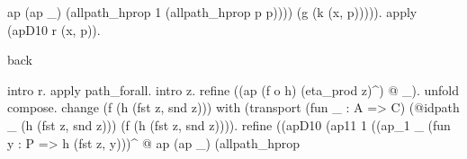 \begin{coqdoccode}
\begin{coqdoccomment}
ap\coqdocindent{0.50em}
(ap\coqdocindent{0.50em}
\_)\coqdoceol
\coqdocindent{8.50em}
(allpath\_hprop\coqdocindent{0.50em}
1\coqdocindent{0.50em}
(allpath\_hprop\coqdocindent{0.50em}
p\coqdocindent{0.50em}
p))))\coqdocindent{0.50em}
\coqdoceol
\coqdocindent{5.50em}
(g\coqdocindent{0.50em}
(k\coqdocindent{0.50em}
(x,\coqdocindent{0.50em}
p))))).\coqdoceol
\coqdocindent{1.00em}
apply\coqdocindent{0.50em}
(apD10\coqdocindent{0.50em}
r\coqdocindent{0.50em}
(x,\coqdocindent{0.50em}
p)).\coqdoceol
\coqdoceol
\coqdocindent{1.00em}
\begin{coqdoccomment}
\coqdocindent{0.50em}
back\coqdocindent{0.50em}
\end{coqdoccomment}
\coqdoceol
\coqdocindent{1.00em}
intro\coqdocindent{0.50em}
r.\coqdoceol
\coqdocindent{1.00em}
apply\coqdocindent{0.50em}
path\_forall.\coqdocindent{0.50em}
intro\coqdocindent{0.50em}
z.\coqdoceol
\coqdocindent{1.00em}
refine\coqdocindent{0.50em}
((ap\coqdocindent{0.50em}
(f\coqdocindent{0.50em}
o\coqdocindent{0.50em}
h)\coqdocindent{0.50em}
(eta\_prod\coqdocindent{0.50em}
z)\^{})\coqdocindent{0.50em}
@\coqdocindent{0.50em}
\_).\coqdoceol
\coqdocindent{1.00em}
unfold\coqdocindent{0.50em}
compose.\coqdoceol
\coqdocindent{1.00em}
change\coqdocindent{0.50em}
(f\coqdocindent{0.50em}
(h\coqdocindent{0.50em}
(fst\coqdocindent{0.50em}
z,\coqdocindent{0.50em}
snd\coqdocindent{0.50em}
z)))\coqdocindent{0.50em}
\coqdoceol
\coqdocindent{2.00em}
with\coqdocindent{0.50em}
(transport\coqdocindent{0.50em}
(fun\coqdocindent{0.50em}
\_\coqdocindent{0.50em}
:\coqdocindent{0.50em}
A\coqdocindent{0.50em}
=>\coqdocindent{0.50em}
C)\coqdocindent{0.50em}
\coqdoceol
\coqdocindent{10.00em}
(@idpath\coqdocindent{0.50em}
\_\coqdocindent{0.50em}
(h\coqdocindent{0.50em}
(fst\coqdocindent{0.50em}
z,\coqdocindent{0.50em}
snd\coqdocindent{0.50em}
z)))\coqdocindent{0.50em}
\coqdoceol
\coqdocindent{10.00em}
(f\coqdocindent{0.50em}
(h\coqdocindent{0.50em}
(fst\coqdocindent{0.50em}
z,\coqdocindent{0.50em}
snd\coqdocindent{0.50em}
z)))).\coqdoceol
\coqdocindent{1.00em}
refine\coqdocindent{0.50em}
((apD10\coqdoceol
\coqdocindent{5.50em}
(ap11\coqdocindent{0.50em}
1\coqdoceol
\coqdocindent{7.00em}
((ap\_1\coqdocindent{0.50em}
\_\coqdocindent{0.50em}
(fun\coqdocindent{0.50em}
y\coqdocindent{0.50em}
:\coqdocindent{0.50em}
P\coqdocindent{0.50em}
=>\coqdocindent{0.50em}
h\coqdocindent{0.50em}
(fst\coqdocindent{0.50em}
z,\coqdocindent{0.50em}
y)))\^{}\coqdocindent{0.50em}
@\coqdoceol
\coqdocindent{7.50em}
ap\coqdocindent{0.50em}
(ap\coqdocindent{0.50em}
\_)\coqdoceol
\coqdocindent{8.50em}
(allpath\_hprop\coqdocindent{0.50em}

\end{coqdoccomment}
\end{coqdoccode}
